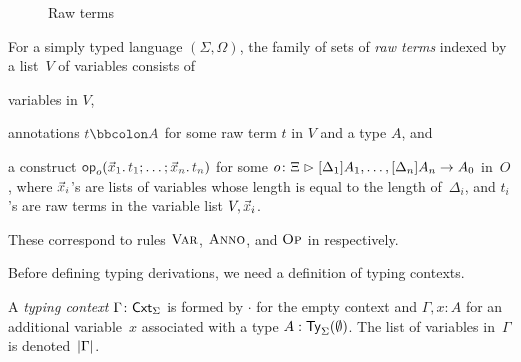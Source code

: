 \begin{definition}
\begin{figure}
  \centering
  \small
  \caption{Raw terms}
  \label{fig:raw-terms}
\end{figure}
  For a simply typed language $(\Sigma, \Omega)$, the family of sets of \emph{raw terms} indexed by a list~$V$ of variables consists of
  \begin{enumerate*}
    \item variables in $V$,
    \item annotations $\isTerm{t \annotate A}$ for some raw term $t$ in $V$ and a type $A$, and
    \item a construct $\tmOpts$ for some $o\colon \Xi \mathrel{\rhd} [\Delta_{1}]A_{1}, \ldots, [\Delta_{n}]A_{n} \to A_0$ in~$O$, where $\vars{x}_{\isTerm{i}}$'s are lists of variables whose length is equal to the length of~$\Delta_i$, and $t_i$'s are raw terms in the variable list $V, \vars{x}_i$.
  \end{enumerate*}
  These correspond to rules $\textnormal{\textsc{Var}}$, $\textnormal{\textsc{Anno}}$, and $\textnormal{\textsc{Op}}$ in  respectively.
\end{definition}

Before defining typing derivations, we need a definition of typing contexts.

\begin{definition}
A \emph{typing context} $\Gamma \colon \mathsf{Cxt}_{\Sigma}$ is formed by $\cdot$ for the empty context and $\Gamma, x : A$ for an additional variable~$x$ associated with a type $A : \mathsf{Ty}_{\Sigma}(\emptyset)$.
The list of variables in~$\Gamma$ is denoted~$\left|\Gamma\right|$.
\end{definition}

